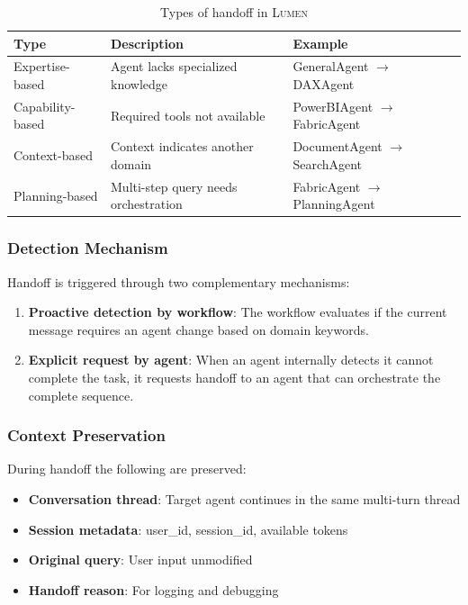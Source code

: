 \documentclass[11pt,a4paper]{article}
\theoremstyle{definition}
\theoremstyle{remark}
\newcommand{\lumen}{\textsc{Lumen}\xspace}
\begin{document}
\begin{table}[H]
\centering
\begin{tabular}{lll}
\toprule
\textbf{Type} & \textbf{Description} & \textbf{Example} \\
\midrule
Expertise-based & Agent lacks specialized knowledge & GeneralAgent $\rightarrow$ DAXAgent \\
Capability-based & Required tools not available & PowerBIAgent $\rightarrow$ FabricAgent \\
Context-based & Context indicates another domain & DocumentAgent $\rightarrow$ SearchAgent \\
Planning-based & Multi-step query needs orchestration & FabricAgent $\rightarrow$ PlanningAgent \\
\bottomrule
\end{tabular}
\caption{Types of handoff in \lumen}
\label{tab:handoff-types}
\end{table}

\subsubsection{Detection Mechanism}

Handoff is triggered through two complementary mechanisms:

\begin{enumerate}
    \item \textbf{Proactive detection by workflow}: The workflow evaluates if the current message requires an agent change based on domain keywords.

    \item \textbf{Explicit request by agent}: When an agent internally detects it cannot complete the task, it requests handoff to an agent that can orchestrate the complete sequence.
\end{enumerate}

\subsubsection{Context Preservation}

During handoff the following are preserved:
\begin{itemize}
    \item \textbf{Conversation thread}: Target agent continues in the same multi-turn thread
    \item \textbf{Session metadata}: user\_id, session\_id, available tokens
    \item \textbf{Original query}: User input unmodified
    \item \textbf{Handoff reason}: For logging and debugging
\end{itemize}
\end{document}

